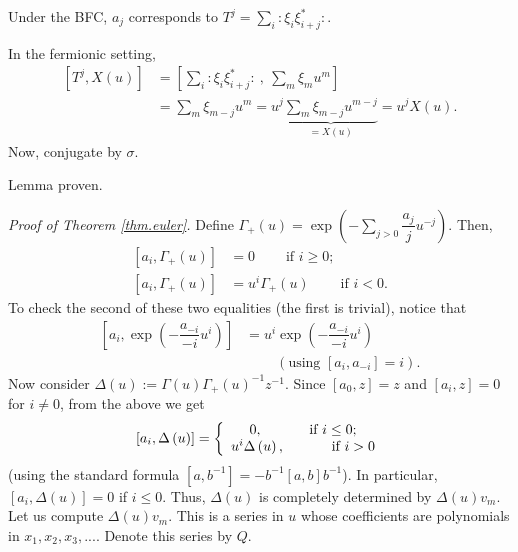 \documentclass
[numbers=enddot,12pt,final,onecolumn,german,notitlepage]{scrartcl}%
\theoremstyle{definition}
\begin{document}
Under the BFC, $a_{j}$ corresponds to $T^{j}=\sum\limits_{i}:\xi_{i}\xi
_{i+j}^{\ast}:$.

In the fermionic setting,%
\begin{align*}
\left[  T^{j},X\left(  u\right)  \right]   &  =\left[  \sum\limits_{i}:\xi
_{i}\xi_{i+j}^{\ast}:\ ,\ \sum\limits_{m}\xi_{m}u^{m}\right] \\
&  =\sum\limits_{m}\xi_{m-j}u^{m}=u^{j}\underbrace{\sum\limits_{m}\xi
_{m-j}u^{m-j}}_{=X\left(  u\right)  }=u^{j}X\left(  u\right)  .
\end{align*}
Now, conjugate by $\sigma$.

Lemma proven.

\textit{Proof of Theorem \ref{thm.euler}.} Define $\Gamma_{+}\left(  u\right)
=\exp\left(  -\sum\limits_{j>0}\dfrac{a_{j}}{j}u^{-j}\right)  $. Then,%
\begin{align*}
\left[  a_{i},\Gamma_{+}\left(  u\right)  \right]   &
=0\ \ \ \ \ \ \ \ \ \ \text{if }i\geq0;\\
\left[  a_{i},\Gamma_{+}\left(  u\right)  \right]   &  =u^{i}\Gamma_{+}\left(
u\right)  \ \ \ \ \ \ \ \ \ \ \text{if }i<0.
\end{align*}
To check the second of these two equalities (the first is trivial), notice
that
\begin{align*}
\left[  a_{i},\exp\left(  -\dfrac{a_{-i}}{-i}u^{i}\right)  \right]   &
=u^{i}\exp\left(  -\dfrac{a_{-i}}{-i}u^{i}\right) \\
&  \ \ \ \ \ \ \ \ \ \ \left(  \text{using }\left[  a_{i},a_{-i}\right]
=i\right)  .
\end{align*}
Now consider $\Delta\left(  u\right)  :=\Gamma\left(  u\right)  \Gamma
_{+}\left(  u\right)  ^{-1}z^{-1}$. Since $\left[  a_{0},z\right]  =z$ and
$\left[  a_{i},z\right]  =0$ for $i\neq0$, from the above we get%
\[
\left[  a_{i},\Delta\left(  u\right)  \right]  =\left\{
\begin{array}
[c]{c}%
0,\ \ \ \ \ \ \ \ \ \ \text{if }i\leq0;\\
u^{i}\Delta\left(  u\right)  ,\ \ \ \ \ \ \ \ \ \ \text{if }i>0
\end{array}
\right.
\]
(using the standard formula $\left[  a,b^{-1}\right]  =-b^{-1}\left[
a,b\right]  b^{-1}$). In particular, $\left[  a_{i},\Delta\left(  u\right)
\right]  =0$ if $i\leq0$. Thus, $\Delta\left(  u\right)  $ is completely
determined by $\Delta\left(  u\right)  v_{m}$. Let us compute $\Delta\left(
u\right)  v_{m}$. This is a series in $u$ whose coefficients are polynomials
in $x_{1},x_{2},x_{3},...$. Denote this series by $Q$.
\end{document}
